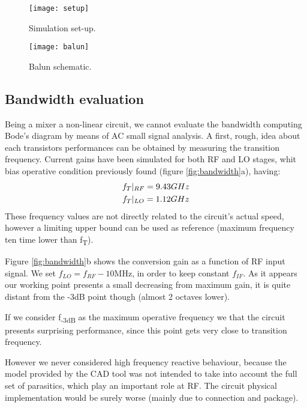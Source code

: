 \begin{figure}[H]
	\centering %
	\texttt{[image: setup]}
	\caption{Simulation set-up.}
	\label{fig:setup}
\end{figure}


\begin{figure}[H]
	\centering
	\texttt{[image: balun]}
	\caption{Balun schematic.}
	\label{fig:balun}
\end{figure}

\subsection{Bandwidth evaluation}

Being a mixer a non-linear circuit, we cannot evaluate the bandwidth computing Bode's diagram by means of AC small signal analysis. 
A first, rough, idea about each transistors performances can be obtained by measuring the transition frequency. Current gains have been simulated for both RF and LO stages, whit bias operative condition previously found (figure \ref{fig:bandwidth}a), having:
\begin{gather}
f_T|_{RF}=9.43GHz \notag \\
f_T|_{LO}=1.12GHz \notag 
\end{gather}  
These frequency values are not directly related to the circuit's actual speed, however a limiting upper bound can be used as reference (maximum frequency ten time lower than f\textsubscript{T}). 

Figure \ref{fig:bandwidth}b shows the conversion gain as a function of RF input signal. We set \(f_{LO}=f_{RF}-10\)MHz, in order to keep constant \(f_{IF}\). As it appears our working point presents a small decreasing from maximum gain, it is quite distant from the -3dB point though (almost 2 octaves lower).

If we consider f\textsubscript{-3dB} as the maximum operative frequency we that the circuit presents surprising performance, since this point gets very close to transition frequency. 

However we never considered high frequency reactive behaviour, because the model provided by the CAD tool was not intended to take into account the full set of parasitics, which play an important role at RF. The circuit physical implementation would be surely worse (mainly due to connection and package).


